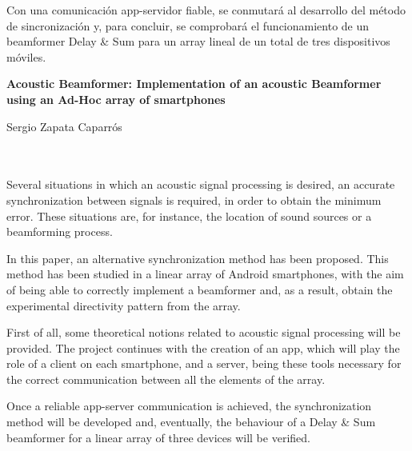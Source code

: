 Con una comunicación app-servidor fiable, se conmutará al desarrollo del método de sincronización y, para concluir, se comprobará el funcionamiento de un beamformer Delay \& Sum para un array lineal de un total de tres dispositivos móviles.
\cleardoublepage


\thispagestyle{empty}


\begin{center}
{\large\bfseries Acoustic Beamformer: Implementation of an acoustic Beamformer using an Ad-Hoc array of smartphones}\\
\end{center}
\begin{center}
Sergio Zapata Caparrós\\
\end{center}

\vspace{0.7cm}
\\

\vspace{0.7cm}
\\

Several situations in which an acoustic signal processing is desired, an accurate synchronization between signals is required, in order to obtain the minimum error. These situations are, for instance, the location of sound sources or a beamforming process.

In this paper, an alternative synchronization method has been proposed. This method has been studied in a linear array of Android smartphones, with the aim of being able to correctly implement a beamformer and, as a result, obtain the experimental directivity pattern from the array.

First of all, some theoretical notions related to acoustic signal processing will be provided. The project continues with the creation of an app, which will play the role of a client on each smartphone, and a server, being these tools necessary for the correct communication between all the elements of the array.

Once a reliable app-server communication is achieved, the synchronization method will be developed and, eventually, the behaviour of a Delay \& Sum beamformer for a linear array of three devices will be verified.


